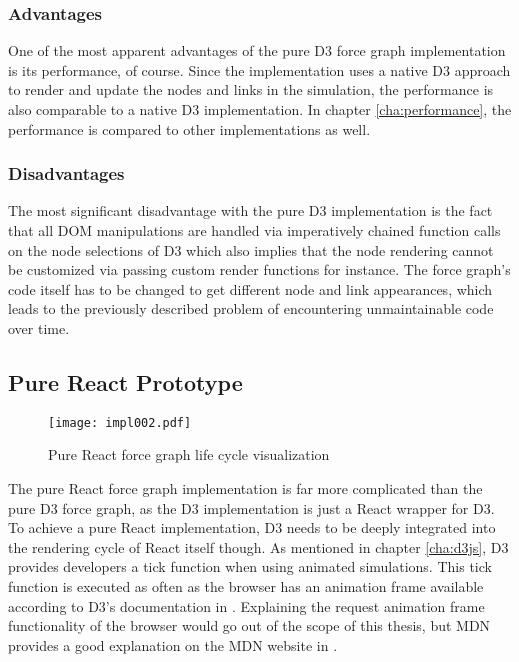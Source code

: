 \subsubsection{Advantages}

One of the most apparent advantages of the pure D3 force graph implementation is its performance, of course. Since the implementation uses a native D3 approach to render and update the nodes and links in the simulation, the performance is also comparable to a native D3 implementation. In chapter \ref{cha:performance}, the performance is compared to other implementations as well.

\subsubsection{Disadvantages}

The most significant disadvantage with the pure D3 implementation is the fact that all DOM manipulations are handled via imperatively chained function calls on the node selections of D3 which also implies that the node rendering cannot be customized via passing custom render functions for instance. The force graph's code itself has to be changed to get different node and link appearances, which leads to the previously described problem of encountering unmaintainable code over time.


\subsection{Pure React Prototype}
\label{sec:pureReactPrototype}

\begin{figure}
\centering
\texttt{[image: impl002.pdf]}
\caption{Pure React force graph life cycle visualization}
\label{fig:pureReactLifecycle}
\end{figure}

The pure React force graph implementation is far more complicated than the pure D3 force graph, as the D3 implementation is just a React wrapper for D3. To achieve a pure React implementation, D3 needs to be deeply integrated into the rendering cycle of React itself though. As mentioned in chapter \ref{cha:d3js}, D3 provides developers a tick function when using animated simulations. This tick function is executed as often as the browser has an animation frame available according to D3's documentation in \cite[/d3-timer/blob/master/README.md]{D3Github}. Explaining the request animation frame functionality of the browser would go out of the scope of this thesis, but MDN provides a good explanation on the MDN website in \cite{RAF}.

